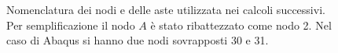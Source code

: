 \begin{figure}[htb]
\centering
{}
\caption{Nomenclatura dei nodi e delle aste utilizzata nei calcoli successivi. Per semplificazione il nodo $A$ è stato ribattezzato come nodo 2. Nel caso di Abaqus si hanno due nodi sovrapposti 30 e 31.}
\label{fig:StrutturaConNomenclatura}
\end{figure}